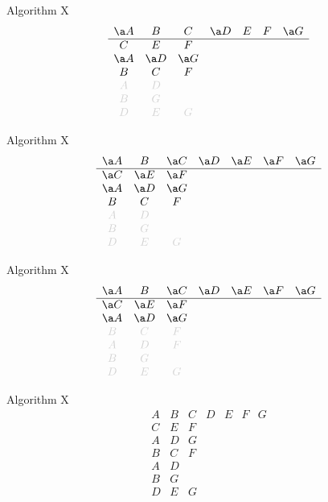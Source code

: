 \documentclass[xcolor=svgnames]{beamer}
\begin{document}
\def\lg{\color{LightGray}}
%
\begin{frame}{Algorithm X}
\Large\boldmath
  $$
  \begin{array}{ccccccc}
    \a A & B & C & \a D & E & F & \a G\\
    \hline
    C & E & F &&&&\\
    \a A & \a D & \a G &&&&\\
    B & C & F &&&&\\
    \lg A & \lg D &&&&&\\
    \lg B & \lg G &&&&&\\
    \lg D & \lg E & \lg G &&&&
  \end{array}
  $$
\end{frame}

%
\begin{frame}{Algorithm X}
\Large\boldmath
  $$
  \begin{array}{ccccccc}
    \a A & B & \a C & \a D & \a E & \a F & \a G\\
    \hline
    \a C & \a E & \a F &&&&\\
    \a A & \a D & \a G &&&&\\
    B & C & F &&&&\\
    \lg A & \lg D &&&&&\\
    \lg B & \lg G &&&&&\\
    \lg D & \lg E & \lg G &&&&
  \end{array}
  $$
\end{frame}

%
\begin{frame}{Algorithm X}
  \Large\boldmath
  $$
  \begin{array}{ccccccc}
    \a A & B & \a C & \a D & \a E & \a F & \a G\\
    \hline
    \a C & \a E & \a F &&&&\\
    \a A & \a D & \a G &&&&\\
    \lg B & \lg C & \lg F &&&&\\
    \lg A & \lg D & \lg F &&&&\\
    \lg B & \lg G &&&&&\\
    \lg D & \lg E & \lg G &&&&
  \end{array}
  $$
\end{frame}

%
\begin{frame}{Algorithm X}
\Large\boldmath
  $$
  \begin{array}{ccccccc}
    A & B & C & D & E & F & G\\
    \hline
    C & E & F &&&&\\
    A & D & G &&&&\\
    B & C & F &&&&\\
    A & D &&&&&\\
    B & G &&&&&\\
    D & E & G &&&&
  \end{array}
  $$
\end{frame}
\end{document}
